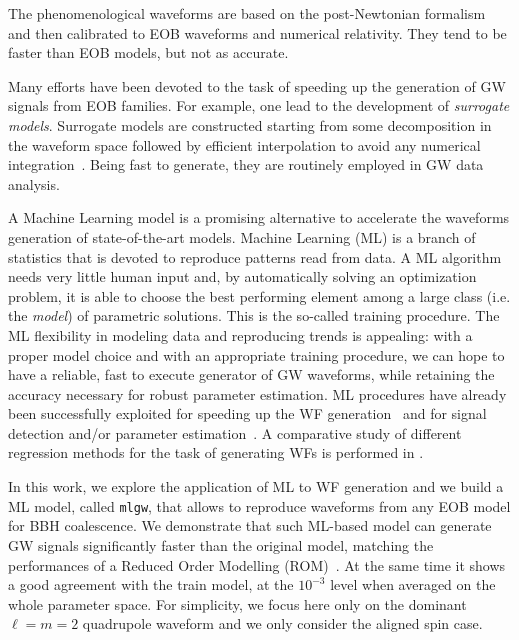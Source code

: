 \documentclass[twocolumn,showpacs,preprintnumbers,nofootinbib,prd,
superscriptaddress,10pt]{revtex4-1}
\begin{document}
The phenomenological waveforms are based on the post-Newtonian formalism and then calibrated 
to  EOB waveforms and numerical relativity. They tend to be faster than EOB models, but not as accurate.

Many efforts have been devoted to the task of speeding up the generation of GW signals from 
EOB families. For example, one lead to the development of \textit{surrogate models}. Surrogate 
models are constructed starting from some decomposition in the waveform space followed by efficient 
interpolation to avoid any  numerical integration~\cite{Purrer:2015tud,Bohe:2016gbl,Purrer:2017str,Lackey:2018zvw,Cotesta:2020qhw}. 
Being fast to generate, they are routinely employed in GW data analysis. 

A Machine Learning model is a promising alternative to accelerate the
waveforms generation of state-of-the-art models.
Machine Learning (ML) is a branch of statistics that is devoted to reproduce patterns read from data. 
A ML algorithm needs very little human input and, by automatically solving an optimization problem, 
it is able to choose the best performing element among a large class (i.e. the \textit{model}) of parametric solutions. 
This is the so-called training procedure. 
The ML flexibility in modeling data and reproducing trends is appealing: with a proper model choice 
and with an appropriate training procedure, we can hope to have a reliable, fast to execute generator 
of GW waveforms, while retaining the accuracy necessary for robust parameter estimation.
ML procedures have already been successfully exploited for speeding up the WF generation~\cite{Khan:2020fso, Chua_2019}
and for signal detection and/or parameter estimation~\cite{Gabbard:2017lja,George:2017pmj,George:2017vlv,Rebei:2018lzh,Chatterjee:2019gqr,Wong:2020wvd, Khan:2020foe}. A comparative study of different regression methods for the task of generating WFs is performed in \cite{Setyawati:2019xzw}.

In this work, we explore the application of ML to WF generation and we build a ML model, called \texttt{mlgw}, that allows to reproduce 
waveforms from any EOB model for BBH coalescence. We demonstrate that such ML-based model can generate 
GW signals significantly faster than the original model, 
matching the performances of a Reduced Order Modelling 
(ROM)~\cite{Purrer:2015tud,Bohe:2016gbl,Purrer:2017str, Field:2013cfa}.  
At the same time it shows a good agreement with the train model, at the $10^{-3}$ level when 
averaged on the whole parameter space. For simplicity, we focus here only on the 
dominant $\ell=m=2$ quadrupole waveform and we only consider the aligned spin case.
\end{document}
